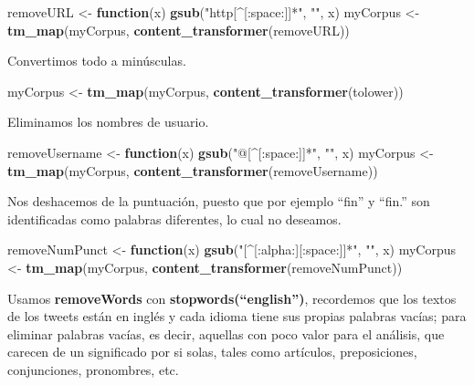 \documentclass[]{article}
\newenvironment{Shaded}{\begin{snugshade}}{\end{snugshade}}
\newcommand{\ControlFlowTok}[1]{\textcolor[rgb]{0.13,0.29,0.53}{\textbf{#1}}}
\newcommand{\KeywordTok}[1]{\textcolor[rgb]{0.13,0.29,0.53}{\textbf{#1}}}
\newcommand{\NormalTok}[1]{#1}
\newcommand{\StringTok}[1]{\textcolor[rgb]{0.31,0.60,0.02}{#1}}
\begin{document}
\begin{Shaded}
\begin{Highlighting}[]
\NormalTok{removeURL <-}\StringTok{ }\ControlFlowTok{function}\NormalTok{(x) }\KeywordTok{gsub}\NormalTok{(}\StringTok{"http[^[:space:]]*"}\NormalTok{, }\StringTok{""}\NormalTok{, x)  }
\NormalTok{myCorpus <-}\StringTok{ }\KeywordTok{tm_map}\NormalTok{(myCorpus, }\KeywordTok{content_transformer}\NormalTok{(removeURL))}
\end{Highlighting}
\end{Shaded}

Convertimos todo a minúsculas.

\begin{Shaded}
\begin{Highlighting}[]
\NormalTok{myCorpus <-}\StringTok{ }\KeywordTok{tm_map}\NormalTok{(myCorpus, }\KeywordTok{content_transformer}\NormalTok{(tolower))}
\end{Highlighting}
\end{Shaded}

Eliminamos los nombres de usuario.

\begin{Shaded}
\begin{Highlighting}[]
\NormalTok{removeUsername <-}\StringTok{ }\ControlFlowTok{function}\NormalTok{(x) }\KeywordTok{gsub}\NormalTok{(}\StringTok{"@[^[:space:]]*"}\NormalTok{, }\StringTok{""}\NormalTok{, x)  }
\NormalTok{myCorpus <-}\StringTok{ }\KeywordTok{tm_map}\NormalTok{(myCorpus, }\KeywordTok{content_transformer}\NormalTok{(removeUsername))}
\end{Highlighting}
\end{Shaded}

Nos deshacemos de la puntuación, puesto que por ejemplo ``fin'' y
``fin.'' son identificadas como palabras diferentes, lo cual no
deseamos.

\begin{Shaded}
\begin{Highlighting}[]
\NormalTok{removeNumPunct <-}\StringTok{ }\ControlFlowTok{function}\NormalTok{(x) }\KeywordTok{gsub}\NormalTok{(}\StringTok{"[^[:alpha:][:space:]]*"}\NormalTok{, }\StringTok{""}\NormalTok{, x)   }
\NormalTok{myCorpus <-}\StringTok{ }\KeywordTok{tm_map}\NormalTok{(myCorpus, }\KeywordTok{content_transformer}\NormalTok{(removeNumPunct))}
\end{Highlighting}
\end{Shaded}

Usamos \textbf{removeWords} con \textbf{stopwords(``english'')},
recordemos que los textos de los tweets están en inglés y cada idioma
tiene sus propias palabras vacías; para eliminar palabras vacías, es
decir, aquellas con poco valor para el análisis, que carecen de un
significado por si solas, tales como artículos, preposiciones,
conjunciones, pronombres, etc.
\end{document}
